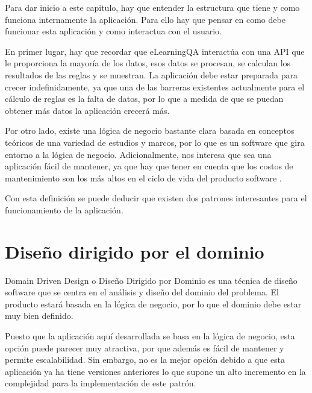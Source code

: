 Para dar inicio a este capitulo, hay que entender la estructura que tiene y como funciona internamente la aplicación. Para ello hay que pensar en como debe funcionar esta aplicación y como interactua con el usuario.

En primer lugar, hay que recordar que eLearningQA interactúa con una API que le proporciona la mayoría de los datos, esos datos se procesan, se calculan los resultados de las reglas y se muestran. La aplicación debe estar preparada para crecer indefinidamente, ya que una de las barreras existentes actualmente para el cálculo de reglas es la falta de datos, por lo que a medida de que se puedan obtener más datos la aplicación crecerá más. 

Por otro lado, existe una lógica de negocio bastante clara basada en conceptos teóricos de una variedad de estudios y marcos, por lo que es un software que gira entorno a la lógica de negocio. Adicionalmente, nos interesa que sea una aplicación fácil de mantener, ya que hay que tener en cuenta que los costos de mantenimiento son los más altos en el ciclo de vida del producto software \cite{costos-mantenimiento}.

Con esta definición se puede deducir que existen dos patrones interesantes para el funcionamiento de la aplicación.

\section{Diseño dirigido por el dominio}
Domain Driven Design o Diseño Dirigido por Dominio es una técnica de diseño software que se centra en el análisis y diseño del dominio del problema. El producto estará basada en la lógica de negocio, por lo que el dominio debe estar muy bien definido. 

Puesto que la aplicación aquí desarrollada se basa en la lógica de negocio, esta opción puede parecer muy atractiva, por que además es fácil de mantener y permite escalabilidad. Sin embargo, no es la mejor opción debido a que esta aplicación ya ha tiene versiones anteriores lo que supone un alto incremento en la complejidad para la implementación de este patrón.


